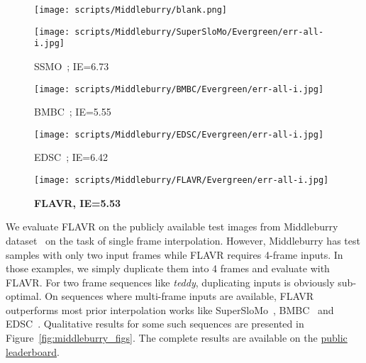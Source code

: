 \documentclass[10pt,twocolumn,letterpaper]{article}
\newcommand{\figref}[1]{Figure~\ref{#1}}
\newcommand{\red}[1]{{#1}}
\newcommand{\twox}{}
\begin{document}
\begin{table*}[!t]
\begin{figure*}[t]
\begin{center}
     \begin{subfigure}[b]{0.18\textwidth}
        \centering
        \texttt{[image: scripts/Middleburry/blank.png]}
    \end{subfigure}
    \hfill
    \begin{subfigure}[b]{0.18\textwidth}
        \centering
        \texttt{[image: scripts/Middleburry/SuperSloMo/Evergreen/err-all-i.jpg]}
        \caption*{SSMO~\cite{jiang2018super}; IE=6.73}
    \end{subfigure}
    \hfill
    \begin{subfigure}[b]{0.18\textwidth}
        \centering
        \texttt{[image: scripts/Middleburry/BMBC/Evergreen/err-all-i.jpg]}
        \caption*{BMBC~\cite{park2020bmbc}; IE=5.55}
    \end{subfigure}
    \hfill
    \begin{subfigure}[b]{0.18\textwidth}
        \centering
        \texttt{[image: scripts/Middleburry/EDSC/Evergreen/err-all-i.jpg]}
        \caption*{EDSC~\cite{cheng2020multiple}; IE=6.42}
    \end{subfigure}
    \hfill
    \begin{subfigure}[b]{0.18\textwidth}
        \centering
        \texttt{[image: scripts/Middleburry/FLAVR/Evergreen/err-all-i.jpg]}
        \caption*{\textbf{FLAVR, IE=5.53}}
    \end{subfigure}
    


    \end{center}
    \caption{Interpolation results for \twox{} interpolation on Middleburry test set. The leftmost images in each row repesent the overlayed inputs. The first row in each set represents the interpolated frame, while the second row shows the error maps with respect to the ground truth. IE shows the interpolation error of the method. The interpolation errors for all the baselines are reported on the \href{https://vision.middlebury.edu/flow/eval/results/results-i1.php}{official leaderboard}.}
    \label{fig:middleburry_figs}
    \vspace{-6pt}
\end{figure*} \red{We evaluate FLAVR on the publicly available test images from Middleburry dataset~\cite{scharstein2014high} on the task of single frame interpolation. However, Middleburry has test samples with only two input frames while FLAVR requires 4-frame inputs. In those examples, we simply duplicate them into 4 frames and evaluate with FLAVR. For two frame sequences like \textit{teddy}, duplicating inputs is obviously sub-optimal. On sequences where multi-frame inputs are available, FLAVR outperforms most prior interpolation works like SuperSloMo~\cite{jiang2018super}, BMBC~\cite{park2020bmbc} and EDSC~\cite{cheng2020multiple}. Qualitative results for some such sequences are presented in \figref{fig:middleburry_figs}. 
The complete results are available on the \href{https://vision.middlebury.edu/flow/eval/results/results-i1.php}{public leaderboard}}.


\end{table*}
\end{document}
